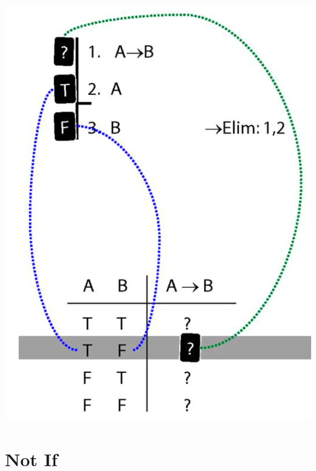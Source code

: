 \documentclass[12pt]{extarticle}
\begin{document}
\begin{multicols*}{3}
\begin{center}
\includegraphics[scale=0.3]{img/unit_700_rule_to_tt.png}
\end{center}
 
 
\section{Not If}
 

\end{multicols*}
\end{document}
